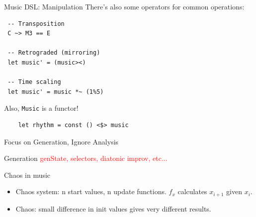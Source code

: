 \documentclass{beamer}
\newcommand{\icode}[1]{\texttt{#1}}
\newcommand\todo[1]{\textcolor{red}{#1}}
\begin{document}
    \begin{frame}[fragile=singleslide]{Music DSL: Manipulation}
	There's also some operators for common operations:

    \begin{verbatim}
 -- Transposition
 C ~> M3 == E

 -- Retrograded (mirroring)
 let music' = (music><)

 -- Time scaling
 let music' = music *~ (1%5)

    \end{verbatim}

	Also, \icode{Music} is a functor!

	\begin{verbatim}
	let rhythm = const () <$> music
    \end{verbatim}
	\end{frame}

	{
	\begin{frame}{Focus on Generation, Ignore Analysis}
	\end{frame}
	}

	\begin{frame}{Generation}
	\todo{genState, selectors, diatonic improv, etc...}
	\end{frame}

        \begin{frame}{Chaos in music}
                    \begin{itemize}
                    \item Chaos system: n start values, n update functions. $f_x$ calculates $x_{i+1}$ given $x_{i}$.
                    \item Chaos: small difference in init values gives very different results.
                    \end{itemize}
        \end{frame}
                  
\end{document}
